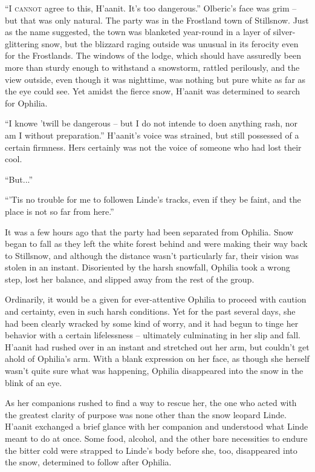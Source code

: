\textsc{``I cannot} agree to this, H'aanit. It's too dangerous.'' Olberic's face was grim -- but that was only natural. The party was in the Frostland town of Stillsnow. Just as the name suggested, the town was blanketed year-round in a layer of silver-glittering snow, but the blizzard raging outside was unusual in its ferocity even for the Frostlands. The windows of the lodge, which should have assuredly been more than sturdy enough to withstand a snowstorm, rattled perilously, and the view outside, even though it was nighttime, was nothing but pure white as far as the eye could see. Yet amidst the fierce snow, H'aanit was determined to search for Ophilia.

``I knowe 'twill be dangerous -- but I do not intende to doen anything rash, nor am I without preparation.'' H'aanit's voice was strained, but still possessed of a certain firmness. Hers certainly was not the voice of someone who had lost their cool.

``But...''

``'Tis no trouble for me to followen Linde's tracks, even if they be faint, and the place is not so far from here.''

It was a few hours ago that the party had been separated from Ophilia. Snow began to fall as they left the white forest behind and were making their way back to Stillsnow, and although the distance wasn't particularly far, their vision was stolen in an instant. Disoriented by the harsh snowfall, Ophilia took a wrong step, lost her balance, and slipped away from the rest of the group.

Ordinarily, it would be a given for ever-attentive Ophilia to proceed with caution and certainty, even in such harsh conditions. Yet for the past several days, she had been clearly wracked by some kind of worry, and it had begun to tinge her behavior with a certain lifelessness -- ultimately culminating in her slip and fall. H'aanit had rushed over in an instant and stretched out her arm, but couldn't get ahold of Ophilia's arm. With a blank expression on her face, as though she herself wasn't quite sure what was happening, Ophilia disappeared into the snow in the blink of an eye.

As her companions rushed to find a way to rescue her, the one who acted with the greatest clarity of purpose was none other than the snow leopard Linde. H'aanit exchanged a brief glance with her companion and understood what Linde meant to do at once. Some food, alcohol, and the other bare necessities to endure the bitter cold were strapped to Linde's body before she, too, disappeared into the snow, determined to follow after Ophilia.

